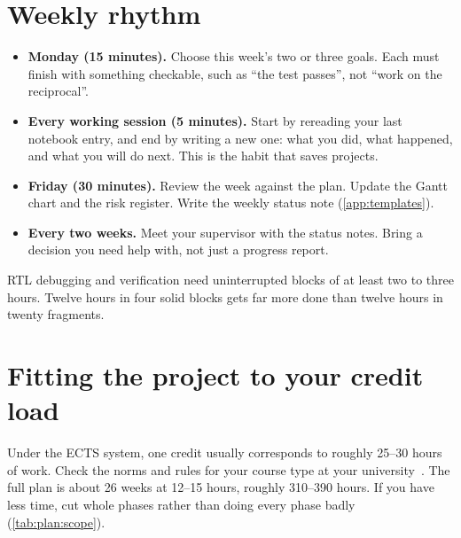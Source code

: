 \section{Weekly rhythm}\label{sec:plan:rhythm}

\begin{itemize}
  \item \textbf{Monday (15 minutes).} Choose this week's two or three goals.
        Each must finish with something checkable, such as \enquote{the
         test passes}, not \enquote{work on the reciprocal}.
  \item \textbf{Every working session (5 minutes).} Start by rereading your last
        notebook entry, and end by writing a new one: what you did, what
        happened, and what you will do next. This is the habit that saves
        projects.
  \item \textbf{Friday (30 minutes).} Review the week against the plan. Update
        the Gantt chart and the risk register. Write the weekly status note
        (\cref{app:templates}).
  \item \textbf{Every two weeks.} Meet your supervisor with the status notes.
        Bring a decision you need help with, not just a progress report.
\end{itemize}

\begin{tipbox}
RTL debugging and verification need uninterrupted blocks of at least two to
three hours. Twelve hours in four solid blocks gets far more done than twelve
hours in twenty fragments.
\end{tipbox}

\section{Fitting the project to your credit load}\label{sec:plan:scope}

Under the ECTS system, one credit usually corresponds to roughly 25--30 hours of
work. Check the norms and rules for your course type at your
university~\cite{ch12-13:dtucoursebase,ch12-13:dtuprojectcourses}. The full plan
is about 26 weeks at 12--15 hours, roughly 310--390 hours. If you have less time,
cut whole phases rather than doing every phase badly
(\cref{tab:plan:scope}).

